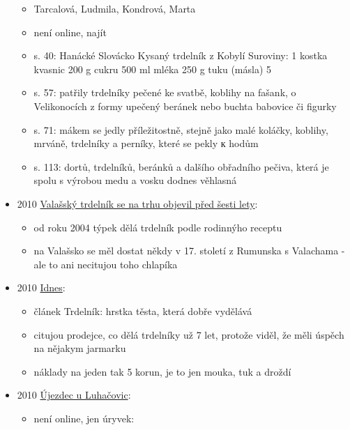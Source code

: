 \begin{itemize}
  \begin{itemize}
  \tightlist
  \item
    Tarcalová, Ludmila, Kondrová, Marta
  \item
    není online, najít
  \item
    s. 40: Hanácké Slovácko Kysaný trdelník z Kobylí Suroviny: 1 kostka
    kvasnic 200 g cukru 500 ml mléka 250 g tuku (másla) 5
  \item
    s. 57: patřily trdelníky pečené ke svatbě, koblihy na fašank, o
    Velikonocích z formy upečený beránek nebo buchta babovice či figurky
  \item
    s. 71: mákem se jedly příležitostně, stejně jako malé koláčky,
    koblihy, mrváně, trdelníky a perníky, které se pekly к hodům
  \item
    s. 113: dortů, trdelníků, beránků a dalšího obřadního pečiva, která
    je spolu s výrobou medu a vosku dodnes věhlasná
  \end{itemize}
\item
  2010
  \href{https://zlinsky.denik.cz/podnikani/valassky-trdelnik-se-na-trhu-objevil-pred-8a2d.html}{Valašský
  trdelník se na trhu objevil před šesti lety}:

  \begin{itemize}
  \tightlist
  \item
    od roku 2004 týpek dělá trdelník podle rodinnýho receptu
  \item
    na Valašsko se měl dostat někdy v 17. století z Rumunska s Valachama
    - ale to ani necitujou toho chlapíka
  \end{itemize}
\item
  2010
  \href{https://www.idnes.cz/ekonomika/domaci/trdelnik-hrstka-testa-ktera-dobre-vydelava.A101230_125615_ekonomika_spi}{Idnes}:

  \begin{itemize}
  \tightlist
  \item
    článek Trdelník: hrstka těsta, která dobře vydělává
  \item
    citujou prodejce, co dělá trdelníky už 7 let, protože viděl, že měli
    úspěch na nějakym jarmarku
  \item
    náklady na jeden tak 5 korun, je to jen mouka, tuk a droždí
  \end{itemize}
\item
  2010
  \href{https://ceskadigitalniknihovna.cz/uuid/uuid:d23e8f20-80e9-11e7-b92d-005056827e51}{Újezdec
  u Luhačovic}:

  \begin{itemize}
  \tightlist
  \item
    není online, jen úryvek:


\end{itemize}
\end{itemize}
